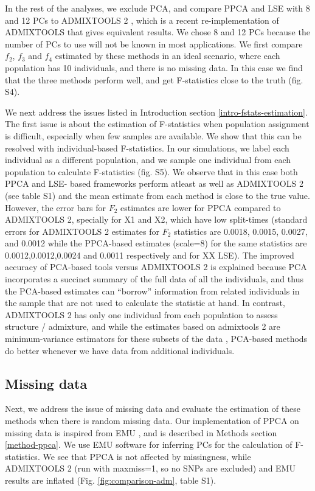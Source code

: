 \documentclass[12pt, letterpaper]{article}
\begin{document}
In the rest of the analyses, we exclude PCA, and compare PPCA and LSE with 8 and 12 PCs to ADMIXTOOLS 2 \cite{maier_limits_2022}, which is a recent re-implementation of ADMIXTOOLS \cite{patterson_ancient_2012} that gives equivalent results. We chose 8 and 12 PCs because the number of PCs to use will not be known in most applications. We first compare $f_2$, $f_3$ and $f_4$ estimated by these methods in an ideal scenario, where each population has 10 individuals, and there is no missing data. In this case we find that the three methods perform well, and get F-statistics close to the truth (fig. S4). 

We next address the issues listed in Introduction section \ref{intro-fstats-estimation}. The first issue is about the estimation of F-statistics when population assignment is difficult, especially when few samples are available. We show that this can be resolved with individual-based F-statistics. In our simulations, we label each individual as a different population, and we sample one individual from each population to calculate F-statistics (fig. S5). We observe that in this case both PPCA and LSE- based frameworks perform atleast as well as ADMIXTOOLS 2 (see table S1) and the mean estimate from each method is close to the true value. However, the error bars for $F_2$ estimates are lower for PPCA compared to ADMIXTOOLS 2, specially for X1 and X2, which have low split-times (standard errors for ADMIXTOOLS 2 estimates for $F_2$ statistics are 0.0018, 0.0015, 0.0027, and 0.0012 while the PPCA-based estimates (scale=8) for the same statistics are 0.0012,0.0012,0.0024 and 0.0011 respectively and for XX LSE). The improved accuracy of PCA-based tools versus ADMIXTOOLS 2 is explained because PCA incorporates a succinct summary of the full data of all the individuals, and thus the PCA-based estimates can ``borrow'' information from related individuals in the sample that are not used to calculate the statistic at hand. In contrast, ADMIXTOOLS 2 has only one individual from each population to assess structure / admixture, and while the estimates based on admixtools 2 are minimum-variance estimators for these subsets of the data \citep{patterson_ancient_2012}, PCA-based methods do better whenever we have data from additional individuals.

\subsection{Missing data}
Next, we address the issue of missing data and evaluate the estimation of these methods when there is random missing data. Our implementation of PPCA on missing data is inspired from EMU \cite{meisner_large-scale_2021}, and is described in Methods section \ref{method-ppca}. We use EMU software for inferring PCs for the calculation of F-statistics. We see that PPCA is not affected by missingness, while ADMIXTOOLS 2 (run with maxmiss=1, so no SNPs are excluded) and EMU results are inflated (Fig. \ref{fig:comparison-adm}, table S1).
\end{document}
